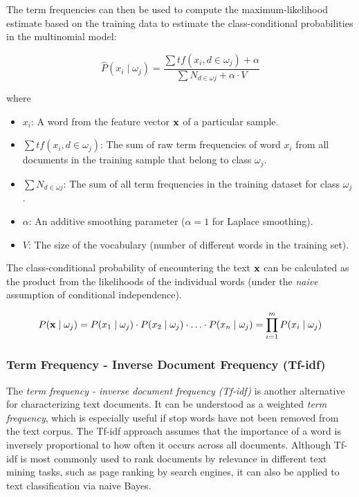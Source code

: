 \documentclass{article}
\begin{document}
The term frequencies can then be used to compute the maximum-likelihood estimate based on the training data to estimate the class-conditional probabilities in the multinomial model:

\begin{equation} \hat{P}(x_i \mid \omega_j) = \frac{\sum tf(x_i, d \in \omega_j) + \alpha}{\sum N_{d \in \omega j} + \alpha \cdot V} \end{equation} 

where

\begin{itemize}
\item  $x_i$: A word from the feature vector $\textbf x$ of a particular sample.
\item  $\sum tf(x_i, d \in \omega_j)$: The sum of raw term frequencies of word $x_i$ from all documents in the training sample that belong to class $\omega_j$.
\item  $\sum N_{d \in \omega j}$: The sum of all term frequencies in the training dataset for class $\omega_j$.
\item $\alpha$: An additive smoothing parameter ($\alpha = 1$ for Laplace smoothing).
\item  $V$: The size of the vocabulary (number of different words in the training set).
\end{itemize}

The class-conditional probability of encountering the text $\textbf x$ can be calculated as the product from the likelihoods of the individual words (under the \emph{naive} assumption of conditional independence).

\begin{equation} P(\textbf x \mid \omega_j) = P(x_1 \mid \omega_j) \cdot P(x_2 \mid \omega_j) \cdot   \dotsc \cdot P(x_n \mid \omega_j) = \prod_{i= 1}^{m}  P(x_i \mid \omega_j)  \end{equation}



\subsubsection{Term Frequency - Inverse Document Frequency (Tf-idf)}
\label{sec:tf-idf}

The \emph{term frequency - inverse document frequency (Tf-idf)} is another alternative for characterizing text documents. It can be understood as a weighted \emph{term frequency}, which is especially useful if stop words have  not been removed from the text corpus. The Tf-idf approach assumes that the importance of a word is inversely proportional to how often it occurs across all documents. Although Tf-idf is most commonly used to rank documents by relevance in different text mining tasks, such as page ranking by search engines, it can also be applied to text classification via naive Bayes.
\end{document}
